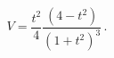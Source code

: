 \begin{equation}
V=\frac{t^2}{4}\frac{\left(4-t^{2}\right)}{\left(1+t^{2}\right) ^{3}}\, .
\label{potential}
\end{equation}

